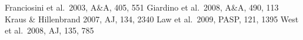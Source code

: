 


\begin{references}
\vspace{-.2cm}
 Franciosini et al.\ 2003, A\&A, 405, 551
 Giardino et al.\ 2008, A\&A, 490, 113
 Kraus \& Hillenbrand 2007, AJ, 134, 2340
 Law et al.\ 2009, PASP, 121, 1395
 West et al.\ 2008, AJ, 135, 785
\end{references}

%
%

